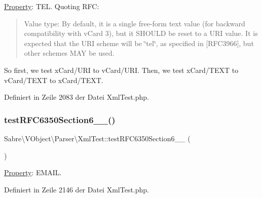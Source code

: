 \mbox{\hyperlink{class_sabre_1_1_v_object_1_1_property}{Property}}\+: T\+EL. Quoting R\+FC\+: \begin{quote}
Value type\+: By default, it is a single free-\/form text value (for backward compatibility with v\+Card 3), but it S\+H\+O\+U\+LD be reset to a U\+RI value. It is expected that the U\+RI scheme will be \char`\"{}tel\char`\"{}, as specified in \mbox{[}R\+F\+C3966\mbox{]}, but other schemes M\+AY be used. \end{quote}


So first, we test x\+Card/\+U\+RI to v\+Card/\+U\+RI. Then, we test x\+Card/\+T\+E\+XT to v\+Card/\+T\+E\+XT to x\+Card/\+T\+E\+XT.

Definiert in Zeile 2083 der Datei Xml\+Test.\+php.

\mbox{\label{class_sabre_1_1_v_object_1_1_parser_1_1_xml_test_a8d4b6b3b3fe4f2caf679f4b3d352ff0d}} 
\subsubsection{\texorpdfstring{test\+R\+F\+C6350\+Section6\+\_\+\_()}{testRFC6350Section6\_4\_2()}}
{\footnotesize\ttfamily Sabre\textbackslash{}\+V\+Object\textbackslash{}\+Parser\textbackslash{}\+Xml\+Test\+::test\+R\+F\+C6350\+Section6\+\_\+\_ (\begin{DoxyParamCaption}{ }\end{DoxyParamCaption})}

\mbox{\hyperlink{class_sabre_1_1_v_object_1_1_property}{Property}}\+: E\+M\+A\+IL. 

Definiert in Zeile 2146 der Datei Xml\+Test.\+php.

\mbox{\label{class_sabre_1_1_v_object_1_1_parser_1_1_xml_test_aaa29cfe04d36afad7845c79e61945723}} 
